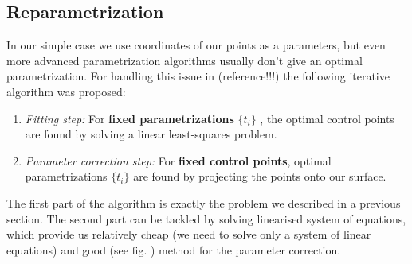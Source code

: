 \subsection{Reparametrization}
In our simple case we use coordinates of our points as a parameters, but even more advanced parametrization algorithms usually don't give an optimal parametrization. For handling this issue in (reference!!!) the following iterative algorithm was proposed:
\begin{enumerate}
\item \textit{Fitting step:} For \textbf{fixed parametrizations} $\{t_{i}\}$ , the optimal control points are found by solving a linear least-squares problem.
\item \textit{Parameter correction step:} For \textbf{fixed control points}, optimal
parametrizations $\{t_{i}\}$ are found by projecting the points onto our surface.
\end{enumerate}
The first part of the algorithm is exactly the problem we described in a previous section. The second part can be tackled by solving linearised system of equations, which provide us relatively cheap (we need to solve only a system of linear equations) and good (see fig. ) method for the parameter correction.
